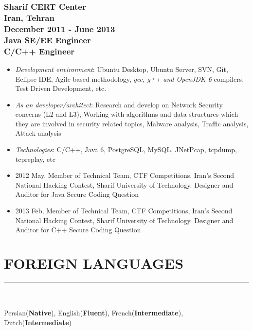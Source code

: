 \documentclass[10pt,a4paper]{article}
\begin{document}
\subsubsection{{\large Sharif CERT Center} \\ 
\textnormal{Iran, Tehran} \\ 
\textnormal{December 2011 - June 2013} \\ 
{Java SE/EE Engineer \\ C/C++ Engineer}}
  \setlength{\leftskip}{0.5cm}
  \setlength{\rightskip}{1cm}
	\begin{itemize}
		\setlength{\rightskip}{1cm}
    \setlength\itemsep{0em}
    \item \small \textit {Development environment}: Ubuntu Desktop, Ubuntu Server, SVN, Git, Eclipse IDE, Agile based methodology, \textit {gcc, g++ and OpenJDK 6} compilers, Test Driven Development, etc.
    \item \small \textit {As an developer/architect}: Research and develop on Network Security concerns (L2 and L3), Working with algorithms and data structures which they are involved in security related topics, Malware analysis, Traffic analysis, Attack analysis
    \item \small \textit {Technologies}: C/C++, Java 6, PostgreSQL, MySQL, JNetPcap, tcpdump, tcpreplay, etc
		\item \small 2012 May, Member of Technical Team, CTF Competitions, Iran's Second National Hacking Contest, Sharif University of Technology. Designer and Auditor for Java Secure Coding Question
		\item \small 2013 Feb, Member of Technical Team, CTF Competitions, Iran's Second National Hacking Contest, Sharif University of Technology. Designer and Auditor for C++ Secure Coding Question
	\end{itemize}
  \setlength{\leftskip}{0pt}
  \setlength{\rightskip}{0cm}


\section{FOREIGN LANGUAGES}
\noindent \rule {5.5cm}{0.4pt} \\ \\
    Persian(\textbf{Native}), 
    English(\textbf{Fluent}), 
    French(\textbf{Intermediate}), 
    Dutch(\textbf{Intermediate}) \\
  
\end{document}
